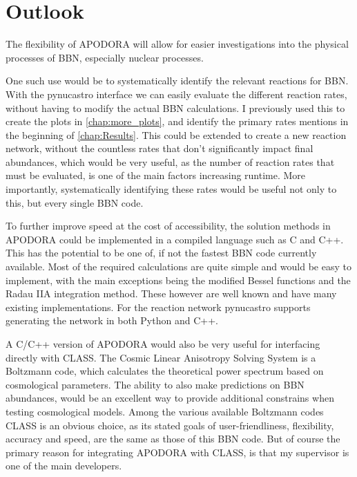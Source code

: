 \section{Outlook}

The flexibility of APODORA will allow for easier investigations into the physical processes of BBN, especially nuclear processes. 

One such use would be to systematically identify the relevant reactions for BBN. With the pynucastro interface we can easily evaluate the different reaction rates, without having to modify the actual BBN calculations. I previously used this to create the plots in \cref{chap:more_plots}, and identify the primary rates mentions in the beginning of \cref{chap:Results}. This could be extended to create a new reaction network, without the countless rates that don't significantly impact final abundances, which would be very useful, as the number of reaction rates that must be evaluated, is one of the main factors increasing runtime. More importantly, systematically identifying these rates would be useful not only to this, but every single BBN code. 

To further improve speed at the cost of accessibility, the solution methods in APODORA could be implemented in a compiled language such as C and C++. This has the potential to be one of, if not the fastest BBN code currently available. Most of the required calculations are quite simple and would be easy to implement, with the main exceptions being the modified Bessel functions and the Radau IIA integration method. These however are well known and have many existing implementations\cite{C_Bessel}. For the reaction network pynucastro supports generating the network in both Python and C++. 

A C/C++ version of APODORA would also be very useful for interfacing directly with CLASS\cite{CLASS_Diego_Blas_2011}. The Cosmic Linear Anisotropy Solving System is a Boltzmann code, which calculates the theoretical power spectrum based on cosmological parameters. The ability to also make predictions on BBN abundances, would be an excellent way to provide additional constrains when testing cosmological models. Among the various available Boltzmann codes CLASS is an obvious choice, as its stated goals of user-friendliness, flexibility, accuracy and speed\cite{CLASS_Diego_Blas_2011}, are the same as those of this BBN code. But of course the primary reason for integrating APODORA with CLASS, is that my supervisor is one of the main developers. 

